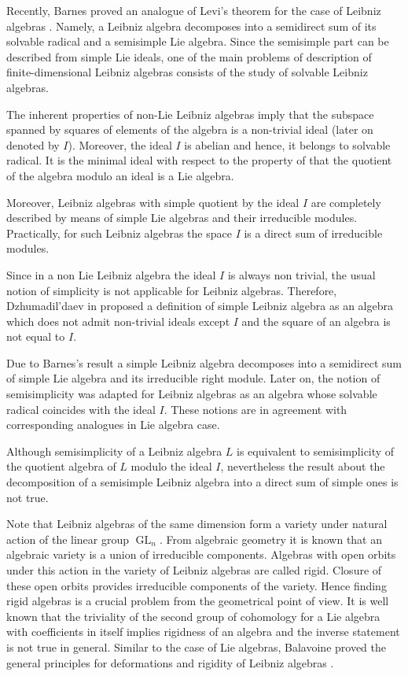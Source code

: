 \documentclass[12pt,reqno]{amsart}
\numberwithin{equation}{section}
\begin{document}
Recently, Barnes proved an analogue of Levi's theorem for the case of Leibniz algebras \cite{Bar4}. Namely, a Leibniz algebra decomposes
 into a semidirect sum of its solvable radical and a semisimple Lie algebra. Since the semisimple part can be described from simple Lie ideals,
  one of the main problems of description of finite-dimensional Leibniz algebras consists of the study of solvable Leibniz algebras.

The inherent properties of non-Lie Leibniz algebras imply that the subspace spanned by squares of elements of the algebra is a non-trivial ideal
 (later on denoted by $I$). Moreover, the ideal $I$ is abelian and hence, it belongs to solvable radical. It is the minimal ideal with respect to the
  property of that the quotient of the algebra modulo an ideal  is a Lie algebra.

Moreover, Leibniz algebras with simple quotient by the ideal $I$ are completely described by means of simple Lie algebras and their irreducible modules.
 Practically, for such Leibniz algebras the space $I$  is a direct sum of irreducible modules.

Since in a non Lie Leibniz algebra the ideal $I$ is always non trivial, the usual notion of simplicity is not applicable for Leibniz algebras.
 Therefore, Dzhumadil'daev  in \cite{AbDz} proposed a definition of simple Leibniz algebra as an algebra which does not admit non-trivial
  ideals except $I$ and the square of an algebra is not equal to $I$.

Due to Barnes's result a simple Leibniz algebra decomposes into a  semidirect sum of simple Lie algebra and its irreducible right module.
 Later on, the notion of semisimplicity was adapted for Leibniz algebras as an algebra whose solvable radical coincides with the ideal $I$.
  These notions are in agreement with corresponding analogues in Lie algebra case.

Although semisimplicity of a Leibniz algebra $L$ is equivalent to semisimplicity of the quotient algebra of $L$ modulo the ideal $I$,
 nevertheless the result about the decomposition of a semisimple Leibniz algebra into a direct sum of simple ones is not true.

Note that Leibniz algebras of the same dimension form a variety under natural action of the linear group $\operatorname{GL}_n$.
 From algebraic geometry it is known that an algebraic variety is a union of irreducible components. Algebras with open orbits
  under this action in the variety of Leibniz algebras are called rigid. Closure of these open orbits provides irreducible components
   of the variety. Hence finding rigid algebras is a crucial problem from the geometrical point of view. It is well known that
    the triviality of the second group of cohomology for a Lie algebra with coefficients in itself implies rigidness of an algebra
    and the inverse statement is not true in general. Similar to the case of Lie algebras, Balavoine proved the general principles
     for deformations and rigidity of Leibniz algebras \cite{Bal}.
\end{document}
